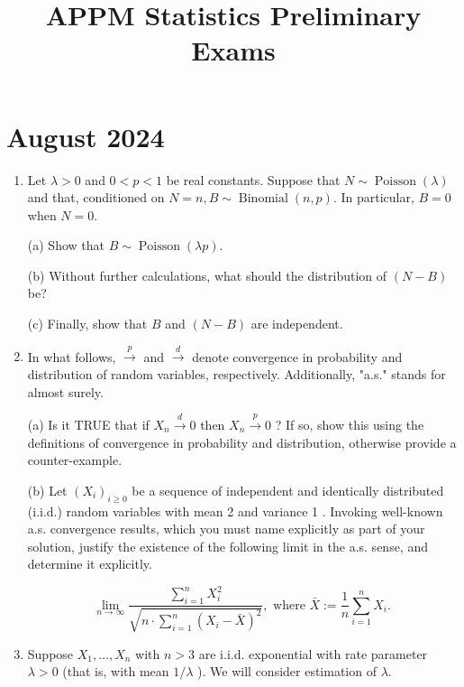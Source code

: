 \documentclass{extarticle}
\title{APPM Statistics Preliminary Exams}
\begin{document}
\author{}

\maketitle

\newpage

\section*{August 2024}

\begin{enumerate}

    \item Let $\lambda>0$ and $0<p<1$ be real constants. Suppose that $N \sim \operatorname{Poisson}(\lambda)$ and that, conditioned on $N=n, B \sim \operatorname{Binomial}(n, p)$. In particular, $B=0$ when $N=0$.
    
(a) Show that $B \sim \operatorname{Poisson}(\lambda p)$.

(b) Without further calculations, what should the distribution of $(N-B)$ be?

(c) Finally, show that $B$ and $(N-B)$ are independent.

\item
In what follows, $\xrightarrow{p}$ and $\xrightarrow{d}$ denote convergence in probability and distribution of random variables, respectively. Additionally, "a.s." stands for almost surely.

(a) Is it TRUE that if $X_n \xrightarrow{d} 0$ then $X_n \xrightarrow{p} 0$ ? If so, show this using the definitions of convergence in probability and distribution, otherwise provide a counter-example.

(b) Let $\left(X_i\right)_{i \geq 0}$ be a sequence of independent and identically distributed (i.i.d.) random variables with mean 2 and variance 1 . Invoking well-known a.s. convergence results, which you must name explicitly as part of your solution, justify the existence of the following limit in the a.s. sense, and determine it explicitly.

$$
\lim _{n \rightarrow \infty} \frac{\sum_{i=1}^n X_i^2}{\sqrt{n \cdot \sum_{i=1}^n\left(X_i-\bar{X}\right)^2}}, \text { where } \bar{X}:=\frac{1}{n} \sum_{i=1}^n X_i \text {. }
$$

\item 
Suppose $X_1, \ldots, X_n$ with $n>3$ are i.i.d. exponential with rate parameter $\lambda>0$ (that is, with mean $1 / \lambda$ ). We will consider estimation of $\lambda$.


\end{enumerate}
\end{document}
